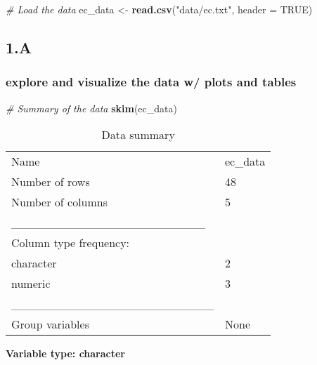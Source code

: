 \documentclass[
]{article}
\newenvironment{Shaded}{\begin{snugshade}}{\end{snugshade}}
\newcommand{\AttributeTok}[1]{\textcolor[rgb]{0.13,0.29,0.53}{#1}}
\newcommand{\CommentTok}[1]{\textcolor[rgb]{0.56,0.35,0.01}{\textit{#1}}}
\newcommand{\ConstantTok}[1]{\textcolor[rgb]{0.56,0.35,0.01}{#1}}
\newcommand{\FunctionTok}[1]{\textcolor[rgb]{0.13,0.29,0.53}{\textbf{#1}}}
\newcommand{\NormalTok}[1]{#1}
\newcommand{\OtherTok}[1]{\textcolor[rgb]{0.56,0.35,0.01}{#1}}
\newcommand{\StringTok}[1]{\textcolor[rgb]{0.31,0.60,0.02}{#1}}
\begin{document}
\begin{Shaded}
\begin{Highlighting}[]
\CommentTok{\# Load the data}
\NormalTok{ec\_data }\OtherTok{\textless{}{-}} \FunctionTok{read.csv}\NormalTok{(}\StringTok{"data/ec.txt"}\NormalTok{, }\AttributeTok{header =} \ConstantTok{TRUE}\NormalTok{)}
\end{Highlighting}
\end{Shaded}

\subsection{1.A}\label{a}

\subsubsection{explore and visualize the data w/ plots and
tables}\label{explore-and-visualize-the-data-w-plots-and-tables}

\begin{Shaded}
\begin{Highlighting}[]
\CommentTok{\# Summary of the data}
\FunctionTok{skim}\NormalTok{(ec\_data)}
\end{Highlighting}
\end{Shaded}

\begin{longtable}[]{@{}ll@{}}
\caption{Data summary}\tabularnewline
\toprule\noalign{}
\endfirsthead
\endhead
\bottomrule\noalign{}
\endlastfoot
Name & ec\_data \\
Number of rows & 48 \\
Number of columns & 5 \\
\_\_\_\_\_\_\_\_\_\_\_\_\_\_\_\_\_\_\_\_\_\_\_ & \\
Column type frequency: & \\
character & 2 \\
numeric & 3 \\
\_\_\_\_\_\_\_\_\_\_\_\_\_\_\_\_\_\_\_\_\_\_\_\_ & \\
Group variables & None \\
\end{longtable}

\textbf{Variable type: character}
\end{document}

